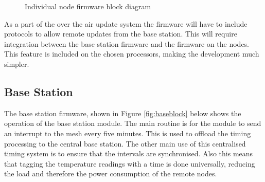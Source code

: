 \documentclass[12pt]{article}
\begin{document}
\begin{figure}[H]
    \centering
    \caption{Individual node firmware block diagram}
\end{figure}

As a part of the over the air update system the firmware will have to include protocols to allow
remote updates from the base station. This will require integration between the base station
firmware and the firmware on the nodes. This feature is included on the chosen processors, making
the development much simpler.

\subsection{Base Station}
The base station firmware, shown in Figure {\ref{fig:baseblock}} below shows the operation of the
base station module. The main routine is for the module to send an interrupt to the mesh every
five minutes. This is used to offload the timing processing to the central base station. The other
main use of this centralised timing system is to ensure that the intervals are synchronised. Also
this means that tagging the temperature readings with a time is done universally, reducing the
load and therefore the power consumption of the remote nodes.
\end{document}
